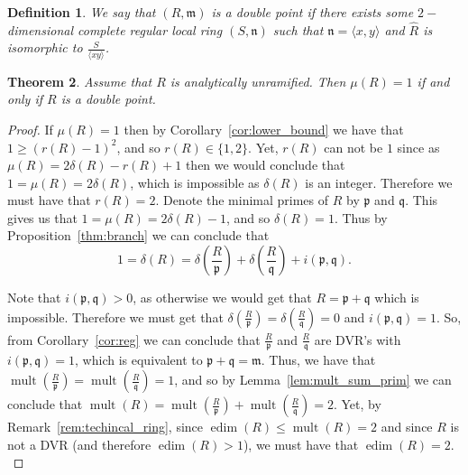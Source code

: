 \documentclass{article}
\newtheorem{theorem}{Theorem}
\newtheorem{definition}[theorem]{Definition}
\DeclareMathOperator{\edim}{edim}
\DeclareMathOperator{\mult}{mult}
\numberwithin{theorem}{section}
\begin{document}
\begin{definition}\label{def:doublept}
    We say that $(R , \mathfrak{m})$ is a double point if there exists some $2-$dimensional complete regular local ring $(S, \mathfrak{n})$ such that $\mathfrak{n} = \langle x,y \rangle$ and $\hat{R}$ is isomorphic to $\frac{S}{\langle xy \rangle}$. 
\end{definition}


\begin{theorem}\label{thm:Morse}
    Assume that $R$ is analytically unramified. Then $\mu(R)=1$ if and only if $R$ is a double point. 
\end{theorem}

\begin{proof}
    If $\mu(R)=1$ then by Corollary~\ref{cor:lower_bound} we have that $1 \geq (r(R)-1)^2$, and so $r(R) \in \{1,2\}$. Yet, $r(R)$ can not be $1$ since as $\mu(R)=2\delta(R)-r(R)+1$ then we would conclude that $1 = \mu(R) = 2\delta(R)$, which is impossible as $\delta(R)$ is an integer. Therefore we must have that $r(R)=2$. Denote the minimal primes of $R$ by $\mathfrak{p}$ and $\mathfrak{q}$. This gives us that $1=\mu(R)=2\delta(R)-1$, and so $\delta(R)=1$. Thus by Proposition~\ref{thm:branch} we can conclude that 
    \begin{equation*}
        1=\delta(R)=\delta\left(\frac{R}{\mathfrak{p}}\right) + \delta\left(\frac{R}{\mathfrak{q}}\right) + i(\mathfrak{p}, \mathfrak{q}).
    \end{equation*}

    \noindent Note that $i(\mathfrak{p}, \mathfrak{q}) >0$, as otherwise we would get that $R=\mathfrak{p}+\mathfrak{q}$ which is impossible. Therefore we must get that $\delta\left(\frac{R}{\mathfrak{p}}\right) =\delta\left(\frac{R}{\mathfrak{q}}\right)=0$ and $i(\mathfrak{p}, \mathfrak{q}) =1$. So, from Corollary~\ref{cor:reg}  we can conclude that $\frac{R}{\mathfrak{p}}$ and $\frac{R}{\mathfrak{q}}$ are DVR's with $i(\mathfrak{p}, \mathfrak{q})=1$, which is equivalent to $\mathfrak{p}+\mathfrak{q}=\mathfrak{m}$. Thus, we have that $\mult\left(\frac{R}{\mathfrak{p}}\right) = \mult\left(\frac{R}{\mathfrak{q}}\right)=1$, and so by Lemma~\ref{lem:mult_sum_prim} we can conclude that $\mult(R)=\mult\left(\frac{R}{\mathfrak{p}}\right) + \mult\left(\frac{R}{\mathfrak{q}}\right) = 2$. Yet, by Remark~\ref{rem:techincal_ring}, since $\edim(R) \leq \mult(R)=2$ and since $R$ is not a DVR (and therefore $\edim(R)>1$), we must have that $\edim(R)=2$. \\


\end{proof}
\end{document}
